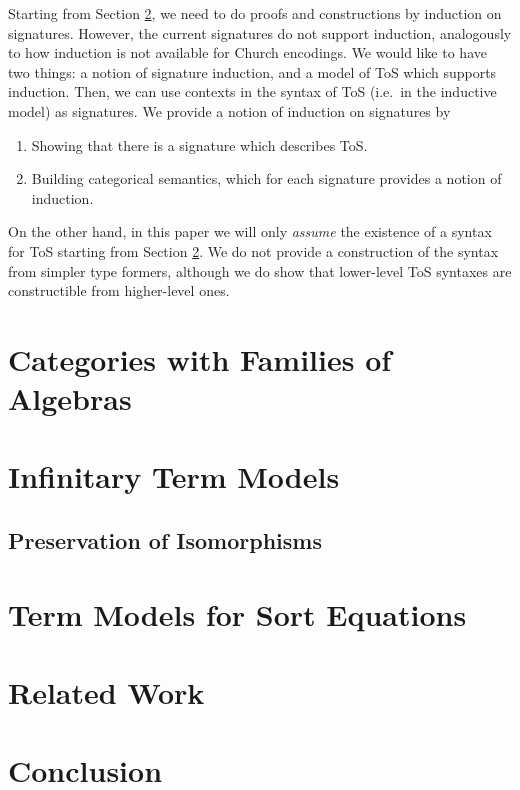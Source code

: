 \documentclass{llncs}
\begin{document}

Starting from Section \ref{sec:infinitary_term}, we need to do proofs and
constructions by induction on signatures. However, the current signatures do not
support induction, analogously to how induction is not available for Church
encodings. We would like to have two things: a notion of signature induction,
and a model of ToS which supports induction. Then, we can use contexts in the
syntax of ToS (i.e.\ in the inductive model) as signatures. We provide a notion
of induction on signatures by
\begin{enumerate}
  \item Showing that there is a signature which describes ToS.
  \item Building categorical semantics, which for each signature provides a notion of induction.
\end{enumerate}
On the other hand, in this paper we will only \emph{assume} the existence of a
syntax for ToS starting from Section \ref{sec:infinitary_term}. We do not provide a
construction of the syntax from simpler type formers, although we do show that
lower-level ToS syntaxes are constructible from higher-level ones.






\section{Categories with Families of Algebras}
\label{sec:cwfmodel}

\section{Infinitary Term Models}
\label{sec:infinitary_term}

\subsection{Preservation of Isomorphisms}

\section{Term Models for Sort Equations}
\label{sec:sort_term}

\section{Related Work}
\label{sec:related}

\section{Conclusion}
\label{sec:conclusion}



\end{document}
